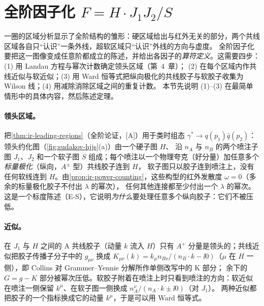 \section{全阶因子化 \texorpdfstring{$F=H\cdot J_1J_2/S$}{F = H J1 J2 / S}}\label{sec:sudakov-factorization}

一圈的区域分析显示了全阶结构的雏形：硬区域给出与红外无关的部分，两个共线区域各自只“认识”一条外线，超软区域只“认识”外线的方向与虚度。
全阶因子化要把这一图像变成任意阶都成立的陈述，并给出各因子的\emph{算符定义}。这需要四步：(1) 用 Landau 方程与幂次计数确定领头区域（第~4~章）；
(2) 在每个区域内作共线近似与软近似；(3) 用 Ward 恒等式把纵向极化的共线胶子与软胶子收集为 Wilson 线；(4) 用减除消除区域之间的重复计数。
本节先说明 (1)--(3) 在最简单情形中的具体内容，然后陈述定理。

\paragraph{领头区域。}把\cref{thm:ir-leading-regions}（全阶论证，[A]）用于类时组态 $\gamma^*\to q(p_1)\bar q(p_2)$：领头约化图（\cref{fig:sudakov-hjjs}(a)）由一个硬子图 $H$、
沿 $n_A$ 与 $n_B$ 的两个喷注子图 $J_1$、$J_2$ 和一个软子图 $S$ 组成；每个喷注以一个物理夸克（好分量）加任意多个\emph{标量极化}（纵向，$A^\pm$ 型）共线胶子连到 $H$，
软子图只以胶子连到喷注上，没有任何软线连到 $H$。由\cref{prop:ir-power-counting}，这些构型的红外发散度 $\omega=0$（多余的标量极化胶子不付出 $\lambda$ 的幂次），
任何其他连接都至少付出一个 $\lambda$ 的幂次。这是一个标度陈述（E-S），它说明\emph{为什么}要处理任意多个纵向胶子：它们不被压低。

\paragraph{近似。}在 $J_1$ 与 $H$ 之间的 A 共线胶子（动量 $k$ 流入 $H$）只有 $A^+$ 分量是领头的；共线近似把胶子传播子分子中的 $g_{\mu\nu}$ 换成
$K_{\mu\nu}(k)=k_\mu n_{B\nu}/(n_B\cdot k-\ii0)$（$\mu$ 在 $H$ 一侧），即 Collins 对 Grammer--Yennie 分解\cite{GrammerYennie1973}所作单侧改写中的 K 部分\cite[第~10.6~节]{Collins2011}；
余下的 $G=g-K$ 部分被幂次压低。软胶子附着在喷注上时只看到喷注的方向：软近似在喷注一侧保留 $k^\mu$、在软子图一侧换成 $n_A^\nu/(n_A\cdot k\pm\ii0)$（对 $J_1$）。
两种近似都把胶子的一个指标换成它的动量 $k^\mu$，于是可以用 Ward 恒等式。

